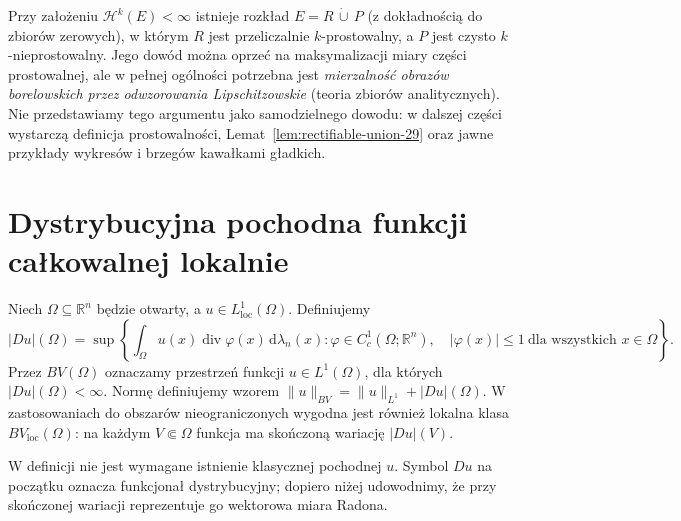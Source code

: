 \begin{uwaga}
Przy założeniu $\mathcal H^k(E)<\infty$ istnieje rozkład
$E=R\,\dot\cup\,P$ (z dokładnością do zbiorów zerowych),
w którym $R$ jest przeliczalnie $k$-prostowalny,
a $P$ jest czysto $k$-nieprostowalny.
Jego dowód można oprzeć na maksymalizacji miary części
prostowalnej, ale w pełnej ogólności potrzebna jest
\emph{mierzalność obrazów borelowskich przez odwzorowania
Lipschitzowskie} (teoria zbiorów analitycznych).
Nie przedstawiamy tego argumentu jako samodzielnego dowodu:
w dalszej części wystarczą definicja prostowalności,
Lemat~\ref{lem:rectifiable-union-29} oraz jawne przykłady
wykresów i brzegów kawałkami gładkich.
\end{uwaga}

\section{Dystrybucyjna pochodna funkcji całkowalnej lokalnie}
\begin{definicja}
\label{def:BV-variation-29}
Niech $\Omega\subseteq\mathbb R^n$ będzie otwarty,
a $u\in L^1_{\mathrm{loc}}(\Omega)$. Definiujemy
\[
 |Du|(\Omega)=\sup\left\{
 \int_\Omega u(x)\operatorname{div}\varphi(x)
   \,\mathrm d\lambda_n(x):
 \varphi\in C_c^1(\Omega;\mathbb R^n),\quad
 |\varphi(x)|\le1\ \text{dla wszystkich }x\in\Omega
 \right\}.
\]
Przez $BV(\Omega)$ oznaczamy przestrzeń
funkcji $u\in L^1(\Omega)$, dla których
$|Du|(\Omega)<\infty$. Normę definiujemy wzorem
$\|u\|_{BV}=\|u\|_{L^1}+|Du|(\Omega)$.
W zastosowaniach do obszarów nieograniczonych
wygodna jest również lokalna klasa $BV_{\mathrm{loc}}(\Omega)$:
na każdym $V\Subset\Omega$ funkcja ma skończoną
wariację $|Du|(V)$.
\end{definicja}

W definicji nie jest wymagane istnienie klasycznej
pochodnej $u$. Symbol $Du$ na początku oznacza
funkcjonał dystrybucyjny; dopiero niżej udowodnimy,
że przy skończonej wariacji reprezentuje go
wektorowa miara Radona.

